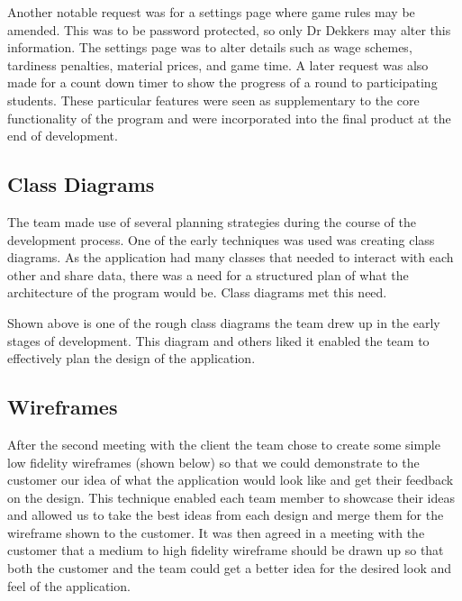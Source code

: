 \documentclass{l3proj}
\begin{document}
Another notable request was for a settings page where game rules may be amended. This was to be password protected, so only Dr Dekkers may alter this information. The settings page was to alter details such as wage schemes, tardiness penalties, material prices, and game time. A later request was also made for a count down timer to show the progress of a round to participating students.  These particular features were seen as supplementary to the core functionality of the program  and were incorporated into the final product at the end of development.

\subsection{Class Diagrams}
The team made use of several planning strategies during the course of the development process. One of the early techniques was used was creating class diagrams. As the application had many classes that needed to interact with each other and share data, there was a need for a structured plan of what the architecture of the program would be. Class diagrams met this need.

Shown above is one of the rough class diagrams the team drew up in the early stages of development. This diagram and others liked it enabled the team to effectively plan the design of the application.

\subsection{Wireframes}
After the second meeting with the client the team chose to create some simple low fidelity wireframes (shown below) so that we could demonstrate to the customer our idea of what the application would look like and get their feedback on the design. This technique enabled each team member to showcase their ideas and allowed us to take the best ideas from each design and merge them for the wireframe shown to the customer. It was then agreed in a meeting with the customer that a medium to high fidelity wireframe should be drawn up so that both the customer and the team could get a better idea for the desired look and feel of the application.
\end{document}
